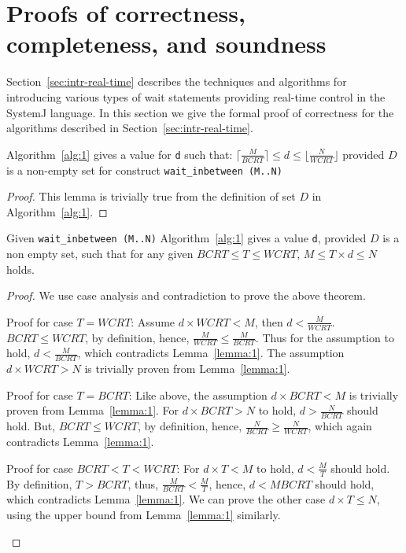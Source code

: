 \section{Proofs of correctness, completeness, and soundness}
\label{sec:proof-correctness}

Section~\ref{sec:intr-real-time} describes the techniques and algorithms
for introducing various types of wait statements providing real-time
control in the SystemJ language. In this section we give the formal
proof of correctness for the algorithms described in
Section~\ref{sec:intr-real-time}.

\begin{lemma}
  Algorithm~\ref{alg:1} gives a value for \texttt{d} such that: $\lceil
  \frac{M}{BCRT} \rceil \leq d \leq \lfloor \frac{N}{WCRT} \rfloor$
  provided $D$ is a non-empty set for construct \texttt{wait\_inbetween
    (M..N)}
\label{lemma:1}
\end{lemma}
\begin{proof}
  This lemma is trivially true from the definition of set $D$ in
  Algorithm~\ref{alg:1}.
\end{proof}

\begin{theorem}
  Given \texttt{wait\_inbetween (M..N)} Algorithm~\ref{alg:1} gives a
  value \texttt{d}, provided $D$ is a non empty set, such that for any
  given $BCRT \leq T \leq WCRT$, $M \leq T \times d \leq N$ holds.
\label{th:1}
\end{theorem}
\begin{proof}
  We use case analysis and contradiction to prove the above theorem.
  \begin{compactenum}[\hspace{0.25cm} 1.]
  \item Proof for case $T = WCRT$: Assume \mbox{$d \times WCRT < M$},
    then $d < \frac{M}{WCRT}$. $BCRT \leq WCRT$, by definition, hence,
    $\frac{M}{WCRT} \leq \frac{M}{BCRT}$. Thus for the assumption to
    hold, $d < \frac{M}{BCRT}$, which contradicts
    Lemma~\ref{lemma:1}. The assumption $d \times WCRT >N$ is trivially
    proven from Lemma~\ref{lemma:1}.
  \item Proof for case $T = BCRT$: Like above, the assumption $d \times
    BCRT < M$ is trivially proven from Lemma~\ref{lemma:1}. For $d
    \times BCRT > N$ to hold, $d > \frac{N}{BCRT}$ should hold. But,
    $BCRT \leq WCRT$, by definition, hence, $\frac{N}{BCRT} \geq
    \frac{N}{WCRT}$, which again contradicts Lemma~\ref{lemma:1}.
  \item Proof for case $BCRT < T < WCRT$: For $d \times T < M$ to hold,
    $d < \frac{M}{T}$ should hold. By definition, $T > BCRT$, thus,
    $\frac{M}{BCRT} < \frac{M}{T}$, hence, $d < {M}{BCRT}$ should hold,
    which contradicts Lemma~\ref{lemma:1}. We can prove the other case
    $d \times T \leq N$, using the upper bound from Lemma~\ref{lemma:1}
    similarly.
  \end{compactenum}
\end{proof}

